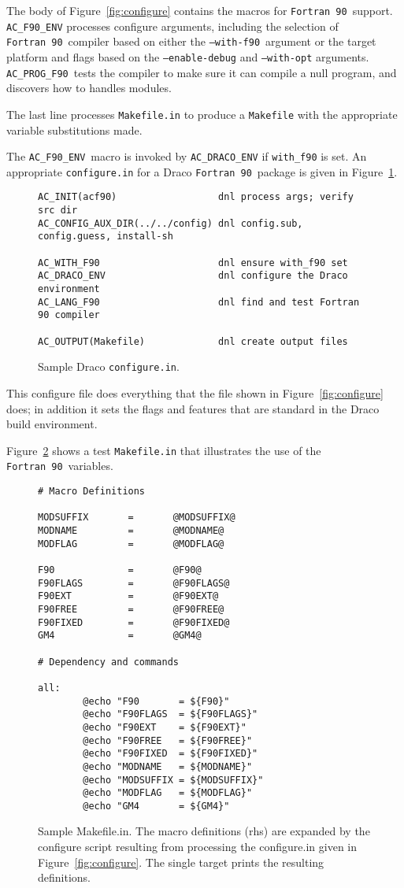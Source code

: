 \documentclass[11pt]{nmemo}
\newcommand{\fninety}{\texttt{Fortran~90}}
\newcommand{\withfninety}{\texttt{--with-f90}}
\newcommand{\fninetyenv}{\texttt{AC\_F90\_ENV}}
\newcommand{\progfninety}{\texttt{AC\_PROG\_F90}}
\begin{document}
The body of Figure~\ref{fig:configure} contains the macros for
\fninety\ support.  \texttt{AC\_F90\_ENV} processes configure
arguments, including the selection of \fninety\ compiler based on
either the \withfninety\ argument or the target platform and flags
based on the \texttt{--enable-debug} and \texttt{--with-opt}
arguments.  \progfninety\ tests  the compiler to make sure it can
compile a null program, and discovers how to handles modules.

The last line processes \texttt{Makefile.in} to produce a
\texttt{Makefile} with the appropriate variable substitutions made.

The \fninetyenv\ macro is invoked by \texttt{AC\_DRACO\_ENV} if
\texttt{with\_f90} is set.  An appropriate \texttt{configure.in} for a
Draco \fninety\ package is given in Figure~\ref{fig:configure2}.
\begin{figure}[hbt]
\hrulefill
\begin{verbatim}
AC_INIT(acf90)                  dnl process args; verify src dir
AC_CONFIG_AUX_DIR(../../config) dnl config.sub, config.guess, install-sh

AC_WITH_F90                     dnl ensure with_f90 set
AC_DRACO_ENV                    dnl configure the Draco environment
AC_LANG_F90                     dnl find and test Fortran 90 compiler 

AC_OUTPUT(Makefile)             dnl create output files
\end{verbatim}
\caption{Sample Draco \texttt{configure.in}.}\label{fig:configure2}
\hrulefill
\end{figure}
This configure file does everything that the file shown in
Figure~\ref{fig:configure} does; in addition it sets the flags and
features that are standard in the Draco build environment.

Figure~\ref{fig:makefile} shows a test \texttt{Makefile.in} that
illustrates the use of the \fninety\ variables.  
\begin{figure}[phbt]
\hrulefill
\begin{verbatim}
# Macro Definitions

MODSUFFIX       =       @MODSUFFIX@
MODNAME         =       @MODNAME@
MODFLAG         =       @MODFLAG@

F90             =       @F90@
F90FLAGS        =       @F90FLAGS@
F90EXT          =       @F90EXT@
F90FREE         =       @F90FREE@
F90FIXED        =       @F90FIXED@
GM4             =       @GM4@

# Dependency and commands

all:
        @echo "F90       = ${F90}"
        @echo "F90FLAGS  = ${F90FLAGS}"
        @echo "F90EXT    = ${F90EXT}"
        @echo "F90FREE   = ${F90FREE}"
        @echo "F90FIXED  = ${F90FIXED}"
        @echo "MODNAME   = ${MODNAME}"
        @echo "MODSUFFIX = ${MODSUFFIX}"
        @echo "MODFLAG   = ${MODFLAG}"
        @echo "GM4       = ${GM4}"
\end{verbatim}%
\caption{Sample Makefile.in.  The macro definitions (rhs) are expanded
by the configure script resulting from processing the configure.in
given in Figure~\ref{fig:configure}.  The single target prints the
resulting definitions.}\label{fig:makefile} \hrulefill
\end{figure}
\end{document}
